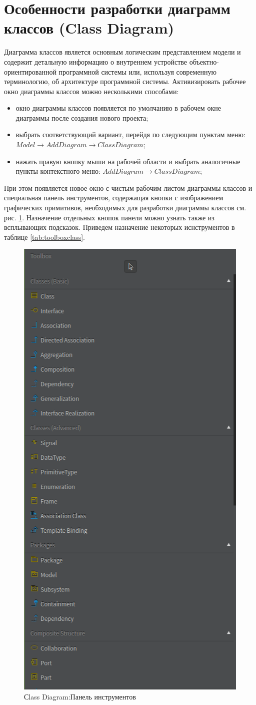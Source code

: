 \documentclass[a4paper,12pt]{report}
\begin{document}
\section{Особенности разработки диаграмм классов (Class Diagram)}
Диаграмма классов является основным логическим представлением модели и содержит детальную информацию о внутреннем устройстве объектно-ориентированной программной системы или, используя современную терминологию, об архитектуре программной системы. Активизировать рабочее окно диаграммы классов можно несколькими способами:
\begin{itemize}
	\item окно диаграммы классов появляется по умолчанию в рабочем окне диаграммы после создания нового проекта;
	\item выбрать соответствующий вариант, перейдя по следующим пунктам меню: \\$Model \to Add Diagram \to Class Diagram$;
	\item нажать правую кнопку мыши на рабочей области и выбрать аналогичные пункты контекстного меню: $Add Diagram \to Class Diagram$;
\end{itemize}

При этом появляется новое окно с чистым рабочим листом диаграммы классов и специальная панель инструментов, содержащая кнопки с изображением графических примитивов, необходимых для разработки диаграммы классов см. рис. \ref{fig:toolboxclass}. Назначение отдельных кнопок панели можно узнать также из всплывающих подсказок. Приведем назначение некоторых иснструментов в таблице \ref{tab:toolboxclass}.

\begin{figure}[h!]
	\centering
	\includegraphics[width=0.5\linewidth]{images/toolboxclass}
	\caption{Сlass Diagram:Панель инструментов}
	\label{fig:toolboxclass}
\end{figure}
\end{document}
